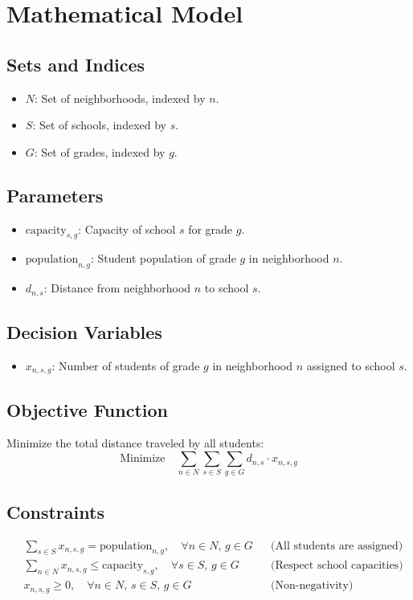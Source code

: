 \documentclass{article}
\begin{document}
\section*{Mathematical Model}

\subsection*{Sets and Indices}
\begin{itemize}
    \item \( N \): Set of neighborhoods, indexed by \( n \).
    \item \( S \): Set of schools, indexed by \( s \).
    \item \( G \): Set of grades, indexed by \( g \).
\end{itemize}

\subsection*{Parameters}
\begin{itemize}
    \item \( \text{capacity}_{s,g} \): Capacity of school \( s \) for grade \( g \).
    \item \( \text{population}_{n,g} \): Student population of grade \( g \) in neighborhood \( n \).
    \item \( d_{n,s} \): Distance from neighborhood \( n \) to school \( s \).
\end{itemize}

\subsection*{Decision Variables}
\begin{itemize}
    \item \( x_{n,s,g} \): Number of students of grade \( g \) in neighborhood \( n \) assigned to school \( s \).
\end{itemize}

\subsection*{Objective Function}
Minimize the total distance traveled by all students:
\[
\text{Minimize} \quad \sum_{n \in N} \sum_{s \in S} \sum_{g \in G} d_{n,s} \cdot x_{n,s,g}
\]

\subsection*{Constraints}
\begin{align*}
    & \sum_{s \in S} x_{n,s,g} = \text{population}_{n,g}, \quad \forall n \in N, \, g \in G && \text{(All students are assigned)} \\
    & \sum_{n \in N} x_{n,s,g} \leq \text{capacity}_{s,g}, \quad \forall s \in S, \, g \in G && \text{(Respect school capacities)} \\
    & x_{n,s,g} \geq 0, \quad \forall n \in N, \, s \in S, \, g \in G && \text{(Non-negativity)}
\end{align*}
\end{document}
